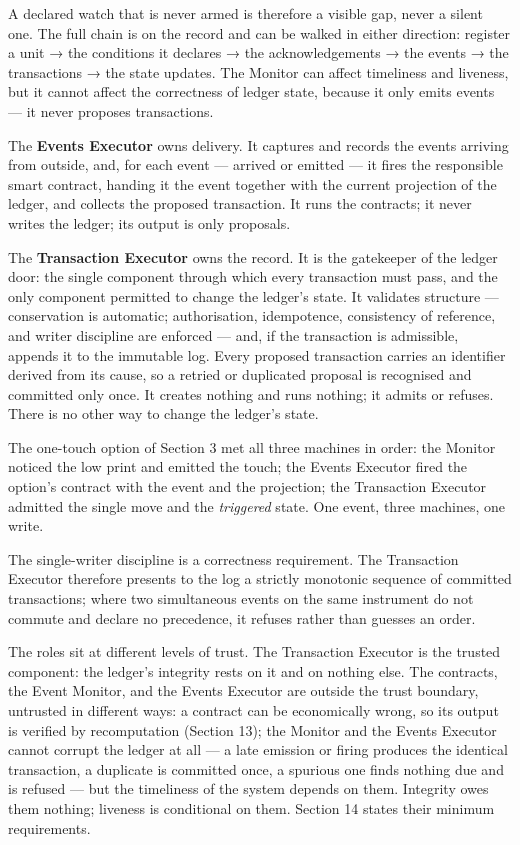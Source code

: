 \documentclass[11pt,a4paper]{article}
\newcommand{\clabel}[1]{\leavevmode\hypertarget{clause-#1}{}%
  \marginpar{\raggedright\scriptsize\ttfamily\textcolor{gray}{#1}}}
\begin{document}
\clabel{C-5.3}A declared watch that is never armed is therefore a visible gap, never a
silent one. The full chain is on the record and can be walked in either
direction: register a unit → the conditions it declares → the
acknowledgements → the events → the transactions → the state updates.
The Monitor can affect timeliness and liveness, but it cannot affect the
correctness of ledger state, because it only emits events --- it never
proposes transactions.

\clabel{C-5.4}The \textbf{Events Executor} owns delivery. It captures and records the
events arriving from outside, and, for each event --- arrived or emitted
--- it fires the responsible smart contract, handing it the event
together with the current projection of the ledger, and collects the
proposed transaction. It runs the contracts; it never writes the ledger;
its output is only proposals.

\clabel{C-5.5}The \textbf{Transaction Executor} owns the record. It is the gatekeeper
of the ledger door: the single component through which every transaction
must pass, and the only component permitted to change the ledger's
state. It validates structure --- conservation is automatic;
authorisation, idempotence, consistency of reference, and writer
discipline are enforced --- and, if the transaction is admissible,
appends it to the immutable log. \clabel{C-5.6}Every proposed transaction carries an
identifier derived from its cause, so a retried or duplicated proposal
is recognised and committed only once. It creates nothing and runs
nothing; it admits or refuses. There is no other way to change the
ledger's state.

The one-touch option of Section 3 met all three machines in order: the
Monitor noticed the low print and emitted the touch; the Events Executor
fired the option's contract with the event and the projection; the
Transaction Executor admitted the single move and the \emph{triggered}
state. One event, three machines, one write.

\clabel{C-5.7}The single-writer discipline is a correctness requirement. The
Transaction Executor therefore presents to the log a strictly monotonic
sequence of committed transactions; where two simultaneous events on the
same instrument do not commute and declare no precedence, it refuses
rather than guesses an order.

\clabel{C-5.8}The roles sit at different levels of trust. The Transaction Executor is
the trusted component: the ledger's integrity rests on it and on nothing
else. The contracts, the Event Monitor, and the Events Executor are
outside the trust boundary, untrusted in different ways: a contract can
be economically wrong, so its output is verified by recomputation
(Section 13); the Monitor and the Events Executor cannot corrupt the
ledger at all --- a late emission or firing produces the identical
transaction, a duplicate is committed once, a spurious one finds nothing
due and is refused --- but the timeliness of the system depends on them.
Integrity owes them nothing; liveness is conditional on them. Section 14
states their minimum requirements.
\end{document}
